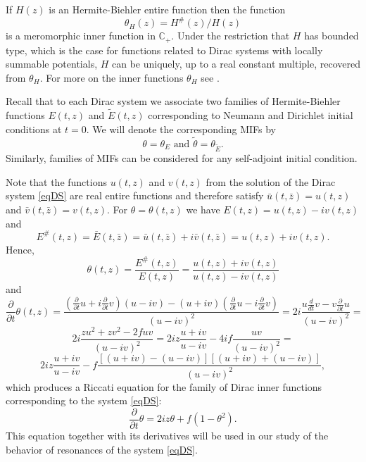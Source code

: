 \documentclass[11pt,twoside,reqno]{amsart}
\def\ti{\tilde}
\def\pa{\partial}
\def\C{{\mathbb{C}}}
\theoremstyle{plain}
\numberwithin{equation}{section}
\begin{document}
If $H(z)$ is an Hermite-Biehler entire function then the function $$\theta_H(z)=H^\#(z)/H(z)$$ is a meromorphic inner function in $\C_+$.
Under the restriction that $H$ has bounded type, which is the case for functions related to Dirac systems with locally summable potentials,
$H$ can be uniquely, up to a real constant multiple, recovered from $\theta_H$. For more 
on the inner functions $\theta_H$  see
\cite{MIF1, MIF2, MP}.



Recall that
to each Dirac system we associate two families of Hermite-Biehler functions $E(t,z)$ and $\ti E(t,z)$ corresponding
to Neumann and Dirichlet initial conditions at $t=0$. We will denote the corresponding MIFs by
$$\theta=\theta_E\text{ and }\ti \theta=\theta_{\ti E}.$$
Similarly, families of MIFs can be considered for any self-adjoint initial condition.

Note that the functions $u(t,z)$ and $v(t,z)$ from the solution of the Dirac system
\eqref{eqDS} are real entire functions and therefore satisfy $\bar u(t,\bar z)=u(t,z)$
and $\bar v(t,\bar z)=v(t,z)$.
For $\theta=\theta(t,z)$ we have $E(t,z)=u(t,z)-iv(t,z)$ and
$$E^{\#}(t,z)=\bar E(t,\bar z)=\bar u(t,\bar z)+i\bar v(t,\bar z)=u(t,z)+iv(t,z).$$
Hence,
$$\theta(t,z)=\frac{E^\#(t,z)}{E(t,z)}=\frac{u(t, z)+iv(t, z)}{u(t,z)-iv(t,z)}$$
and
$$\frac \pa {\pa  t}\theta(t,z)
=\frac{(\frac \pa {\pa  t}u+i\frac \pa {\pa  t}v)(u-iv)-(u+iv)(\frac \pa {\pa  t}u-i\frac \pa {\pa  t}v)}{(u-iv)^2}=2i\frac{u\frac d{dt}v-v\frac \pa {\pa  t}u}{(u-iv)^2}=$$
$$2i\frac{zu^2+zv^2- 2fuv}{(u-iv)^2}=2iz\frac{u+iv}{u-iv}-4if\frac{uv}{(u-iv)^2}=
$$$$2iz\frac{u+iv}{u-iv}-f\frac{[(u+iv)-(u-iv)][(u+iv)+(u-iv)]}{(u-iv)^2},$$
which produces a Riccati equation for the family of Dirac inner functions corresponding to the system \eqref{eqDS}:
\begin{equation} \frac \pa {\pa  t}\theta=2iz\theta+f(1-\theta^2).\label{eqRiccati}\end{equation}
This equation together with its derivatives will be used in our study of the behavior of resonances of the system \eqref{eqDS}.
\end{document}
